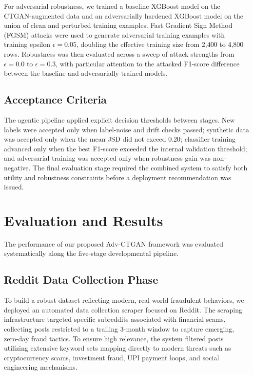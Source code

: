 \documentclass[conference]{IEEEtran}
\begin{document}
For adversarial robustness, we trained a baseline XGBoost model on the CTGAN-augmented data and an adversarially hardened XGBoost model on the union of clean and perturbed training examples. Fast Gradient Sign Method (FGSM) attacks were used to generate adversarial training examples with training epsilon $\epsilon = 0.05$, doubling the effective training size from 2,400 to 4,800 rows. Robustness was then evaluated across a sweep of attack strengths from $\epsilon = 0.0$ to $\epsilon = 0.3$, with particular attention to the attacked F1-score difference between the baseline and adversarially trained models.

\subsection{Acceptance Criteria}
The agentic pipeline applied explicit decision thresholds between stages. New labels were accepted only when label-noise and drift checks passed; synthetic data was accepted only when the mean JSD did not exceed 0.20; classifier training advanced only when the best F1-score exceeded the internal validation threshold; and adversarial training was accepted only when robustness gain was non-negative. The final evaluation stage required the combined system to satisfy both utility and robustness constraints before a deployment recommendation was issued.


\section{Evaluation and Results}
The performance of our proposed Adv-CTGAN framework was evaluated systematically along the five-stage developmental pipeline.

\subsection{Reddit Data Collection Phase}
To build a robust dataset reflecting modern, real-world fraudulent behaviors, we deployed an automated data collection scraper focused on Reddit. The scraping infrastructure targeted specific subreddits associated with financial scams, collecting posts restricted to a trailing 3-month window to capture emerging, zero-day fraud tactics. To ensure high relevance, the system filtered posts utilizing extensive keyword sets mapping directly to modern threats such as cryptocurrency scams, investment fraud, UPI payment loops, and social engineering mechanisms.
\end{document}

